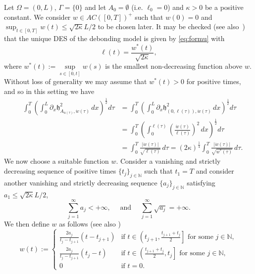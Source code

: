 \documentclass[a4paper,11pt,reqno]{amsart}
\numberwithin{equation}{section}
\theoremstyle{definition}
\theoremstyle{remark}
\newcommand{\n}{\mathbb{N}}
\begin{document}
        Let $\Omega=(0,L)$, $\Gamma=\{0\}$ and let $A_0=\emptyset$ (i.e. $\ell_0=0$) and $\kappa>0$ be a positive constant. We consider $w\in AC([0,T])^+$ such that $w(0)=0$ and $\sup_{t\in [0,T]} w(t)\le \sqrt{2\kappa} L/2$ to be chosen later. It may be checked (see also~\cite[Section 2]{RivQuas}) that the unique DES of the debonding model is given by \eqref{eq:formu} with
        \begin{equation}
            \ell(t)=\frac{w^*(t)}{\sqrt{2\kappa}},
        \end{equation}
        where $w^*(t):=\sup\limits_{s\in [0,t]}w(s)$ is the smallest non-decreasing function above $w$. Without loss of generality we may assume that $w^*(t)>0$ for positive times, and so in this setting we have
        \begin{align}
            \quad\,\int_0^T\left(\int_0^L \partial_x \mathfrak{h}_{A_{u(\tau)},\dot w(\tau)}^2\, dx\right)^\frac 12d\tau & =\int_0^T\left(\int_0^L \partial_x \mathfrak{h}_{(0,\ell(\tau)),\dot w(\tau)}^2\, dx\right)^\frac 12d\tau\\
            &=\int_0^T\left(\int_0^{\ell(\tau)} \left(\frac{\dot w(\tau)}{\ell(\tau)}\right)^2\, dx\right)^\frac 12d\tau \\
            & =\int_0^T \frac{|\dot w(\tau)|}{\sqrt{\ell(\tau)}} \, d\tau=(2\kappa)^\frac 14 \int_0^T \frac{|\dot w(\tau)|}{\sqrt{w^*(\tau)}} \, d\tau.
        \end{align}
        We now choose a suitable function $w$. Consider a vanishing and strictly decreasing sequence of positive times $\{t_j\}_{j\in\n}$ such that $t_1=T$ and consider another  vanishing and strictly decreasing sequence $\{a_j\}_{j\in\n}$ satisfying $a_1\le \sqrt{2\kappa}L/2$,
        \begin{equation}
            \sum_{j=1}^\infty a_j<+\infty,\quad\text{ and }\quad\sum_{j=1}^\infty \sqrt{a_j}=+\infty.
        \end{equation}
We then define $w$ as follows (see also )
        \begin{equation}
            w(t):=\begin{cases}
                \frac{2 a_j}{t_j-t_{j+1}}(t-t_{j+1}) &\text{if }t\in \left(t_{j+1}, \frac{t_{j+1}+t_j}{2}\right]\text{ for some } j\in \n,\\
                \frac{2 a_j}{t_j-t_{j+1}}(t_{j}-t) &\text{if }t\in \left(\frac{t_{j+1}+t_j}{2}, t_{j} \right]\text{ for some } j\in \n,\\
                0&\text{if }t=0.
            \end{cases}
        \end{equation}
\end{document}
